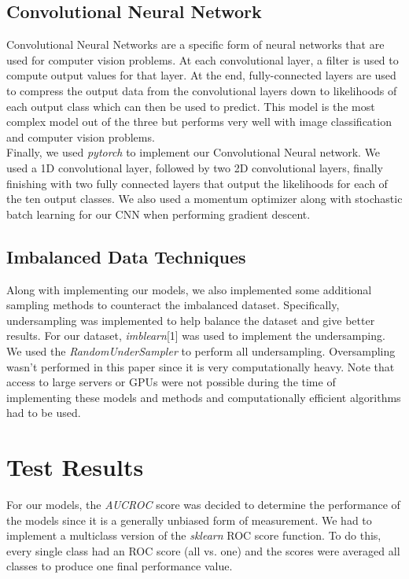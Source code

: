 \documentclass[conference]{IEEEtran}
\begin{document}
\subsection{Convolutional Neural Network}

Convolutional Neural Networks are a specific form of neural networks that are used for computer vision problems. At each convolutional layer, a filter is used to compute output values for that layer. At the end, fully-connected layers are used to compress the output data from the convolutional layers down to likelihoods of each output class which can then be used to predict. This model is the most complex model out of the three but performs very well with image classification and computer vision problems. \\

Finally, we used \emph{pytorch} to implement our Convolutional Neural network. We used a 1D convolutional layer, followed by two 2D convolutional layers, finally finishing with two fully connected layers that output the likelihoods for each of the ten output classes. We also used a momentum optimizer along with stochastic batch learning for our CNN when performing gradient descent. \\

\subsection{Imbalanced Data Techniques}

Along with implementing our models, we also implemented some additional sampling methods to counteract the imbalanced dataset. Specifically, undersampling was implemented to help balance the dataset and give better results. For our dataset, \emph{imblearn}[1] was used to implement the undersamping. We used the \emph{RandomUnderSampler} to perform all undersampling. Oversampling wasn't performed in this paper since it is very computationally heavy. Note that access to large servers or GPUs were not possible during the time of implementing these models and methods and computationally efficient algorithms had to be used. \\

\section{Test Results}

For our models, the \emph{AUCROC} score was decided to determine the performance of the models since it is a generally unbiased form of measurement. We had to implement a multiclass version of the \emph{sklearn} ROC score function. To do this, every single class had an ROC score (all vs. one) and the scores were averaged all classes to produce one final performance value. 
\end{document}
